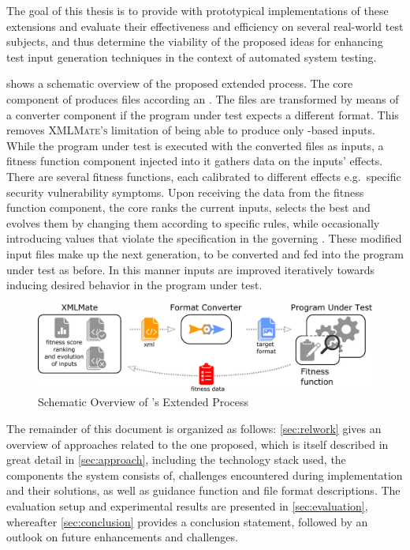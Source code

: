 The goal of this thesis is to provide \xmlmate with prototypical implementations of these extensions and
evaluate their effectiveness and efficiency on several real-world test subjects, and thus determine the
viability of the proposed ideas for enhancing test input generation techniques in the context of automated system testing.

 shows a schematic overview of the proposed extended \xmlmate process.
The core component of \xmlmate produces \xml files according an \xsd. 
The files are transformed by means of a converter component if the program under test expects a different
format. This removes \textsc{XMLMate's} limitation of being able to produce only \xml-based inputs.
While the program under test is executed with the converted files as inputs, a fitness function component
injected into it gathers data on the inputs' effects.
There are several fitness functions, each calibrated to different effects e.g.\ specific security vulnerability
symptoms. 
Upon receiving the data from the fitness function component, the \xmlmate core ranks the current inputs,
selects the best and evolves them by changing them according to specific rules, while occasionally introducing
values that violate the specification in the governing \xsd. 
These modified input files make up the next generation, to be converted and fed into the program under test as
before. 
In this manner inputs are improved iteratively towards inducing desired behavior in the program under test. 

\begin{figure}[htb]
\centering
  \includegraphics[width=\columnwidth]{overview.pdf}
  \caption{Schematic Overview of \xmlmate's Extended Process}
  \label{fig:overview}
\end{figure}

The remainder of this document is organized as follows: \cref{sec:relwork} gives an overview of approaches
related to the one proposed, which is itself described in great detail in \cref{sec:approach}, including the
technology stack used, the components the system consists of, challenges encountered during implementation and
their solutions, as well as guidance function and file format descriptions. The evaluation setup and
experimental results are presented in \cref{sec:evaluation}, whereafter \cref{sec:conclusion} provides a
conclusion statement, followed by an outlook on future enhancements and challenges.
